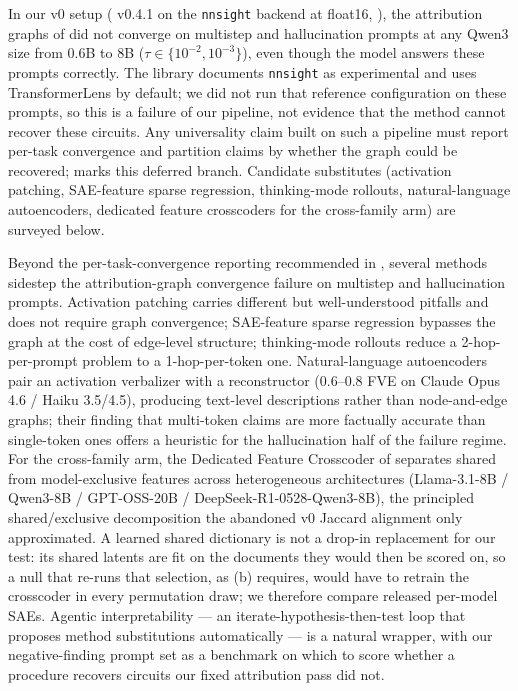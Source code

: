 In our v0 setup (\circuittracer{} v0.4.1 on the \texttt{nnsight} backend at float16,
), the attribution graphs of \citet{ameisen2025attribution} did not converge
on multistep and hallucination prompts at any Qwen3 size from 0.6B to 8B
($\tau\in\{10^{-2},10^{-3}\}$), even though the model answers these prompts correctly. The
library documents \texttt{nnsight} as experimental and uses TransformerLens by default; we did
not run that reference configuration on these prompts, so this is a failure of our pipeline, not
evidence that the method cannot recover these circuits. Any universality claim built on such a
pipeline must report per-task convergence and partition claims by whether the graph could be
recovered;  marks this deferred branch. Candidate substitutes (activation patching, SAE-feature sparse
regression, thinking-mode rollouts, natural-language autoencoders, dedicated feature
crosscoders for the cross-family arm) are surveyed below.

Beyond the per-task-convergence reporting recommended in , several
methods sidestep the attribution-graph convergence failure on multistep and
hallucination prompts. Activation patching \citep{heimersheim2024patching,
syed2023attribution} carries different but well-understood pitfalls and does not require
graph convergence; SAE-feature sparse regression bypasses the graph at the cost of
edge-level structure; thinking-mode rollouts reduce a 2-hop-per-prompt problem to a
1-hop-per-token one. Natural-language autoencoders \citep{nla2026anthropic} pair an
activation verbalizer with a reconstructor (0.6--0.8 FVE on Claude Opus 4.6 / Haiku
3.5/4.5), producing text-level descriptions rather than node-and-edge graphs; their finding
that multi-token claims are more factually accurate than single-token ones offers a
heuristic for the hallucination half of the failure regime. For the cross-family arm, the
Dedicated Feature Crosscoder of \citet{diff_tool2026anthropic} separates shared from
model-exclusive features across heterogeneous architectures (Llama-3.1-8B / Qwen3-8B /
GPT-OSS-20B / DeepSeek-R1-0528-Qwen3-8B), the principled shared/exclusive
decomposition the abandoned v0 Jaccard alignment only approximated. A learned shared dictionary
is not a drop-in replacement for our test: its shared latents are fit on the documents they would
then be scored on, so a null that re-runs that selection, as (b) requires, would
have to retrain the crosscoder in every permutation draw; we therefore compare released per-model SAEs. Agentic
interpretability --- an iterate-hypothesis-then-test loop that proposes method substitutions
automatically --- is a natural wrapper, with our negative-finding prompt set as a benchmark
on which to score whether a procedure recovers circuits our fixed attribution pass did not.

